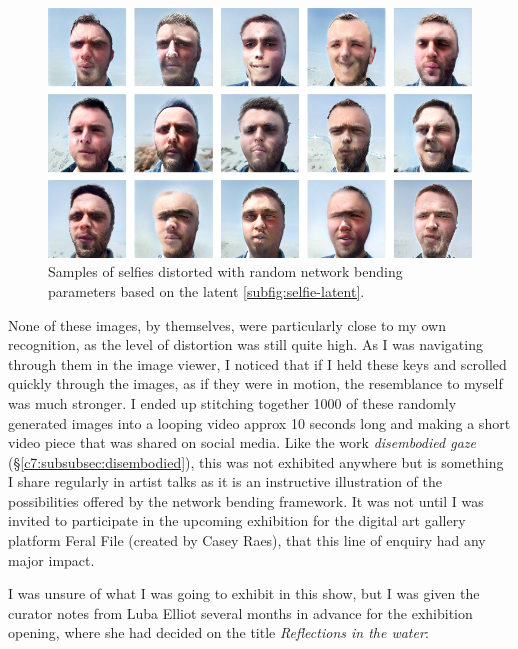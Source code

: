 \begin{figure}[!htb]
    \centering
    \captionsetup{justification=centering}
    \includegraphics[width=1\textwidth]{figures/c7_impact/selfie/selfie-series.png}
    \caption[Samples of selfies distorted with random network bending parameters]{ Samples of selfies distorted with random network bending parameters based on the latent \ref{subfig:selfie-latent}.}
    \label{fig:c7:selfie-series}
\end{figure}


None of these images, by themselves, were particularly close to my own recognition, as the level of distortion was still quite high.
As I was navigating through them in the image viewer, I noticed that if I held these keys and scrolled quickly through the images, as if they were in motion, the resemblance to myself was much stronger. 
I ended up stitching together 1000 of these randomly generated images into a looping video approx 10 seconds long and making a short video piece that was shared on social media. 
Like the work \textit{disembodied gaze} (\S \ref{c7:subsubsec:disembodied}), this was not exhibited anywhere but is something I share regularly in artist talks as it is an instructive illustration of the possibilities offered by the network bending framework.
It was not until I was invited to participate in the upcoming exhibition for the digital art gallery platform Feral File (created by Casey Raes), that this line of enquiry had any major impact. 

I was unsure of what I was going to exhibit in this show, but I was given the curator notes from Luba Elliot several months in advance for the exhibition opening, where she had decided on the title \textit{Reflections in the water}:

